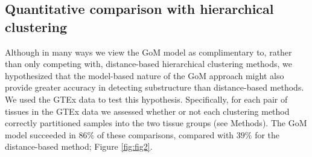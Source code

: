 




\subsection{Quantitative comparison with hierarchical clustering}

Although in many ways we view the GoM model as complimentary to, rather than only competing with, distance-based hierarchical clustering methods,
we hypothesized that the model-based nature of the GoM approach might also provide greater accuracy in detecting substructure than distance-based methods. 
We used the GTEx data to test this hypothesis. Specifically, for each pair of tissues in the GTEx data we assessed whether or not each clustering method
correctly partitioned samples into the two tissue groups (see Methods). The GoM model succeeded in $86 \%$ of these comparisons, compared with $39 \%$ for the distance-based method; Figure \ref{fig:fig2}.

